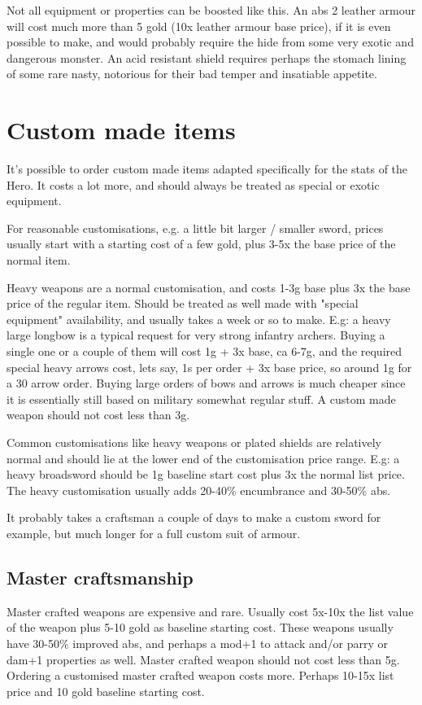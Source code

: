 Not all equipment or properties can be boosted like this. An abs 2 leather armour will cost much more than 5 gold (10x leather armour base price), if it is even possible to make, and would probably require the hide from some very exotic and dangerous monster. An acid resistant shield requires perhaps the stomach lining of some rare nasty, notorious for their bad temper and insatiable appetite.


\section*{Custom made items}
It's possible to order custom made items adapted specifically for the stats of the Hero. It costs a lot more, and should always be treated as special or exotic equipment.

For reasonable customisations, e.g. a little bit larger / smaller sword, prices usually start with a starting cost of a few gold, plus 3-5x the base price of the normal item.

Heavy weapons are a normal customisation, and costs 1-3g base plus 3x the base price of the regular item. Should be treated as well made with "special equipment" availability, and usually takes a week or so to make.
E.g: a heavy large longbow is a typical request for very strong infantry archers. Buying a single one or a couple of them will cost 1g + 3x base, ca 6-7g, and the required special heavy arrows cost, lets say, 1s per order + 3x base price, so around 1g for a 30 arrow order. Buying large orders of bows and arrows is much cheaper since it is essentially still based on military somewhat regular stuff.
A custom made weapon should not cost less than 3g.

Common customisations like heavy weapons or plated shields are relatively normal and should lie at the lower end of the customisation price range. E.g: a heavy broadsword should be 1g baseline start cost plus 3x the normal list price.
The heavy customisation usually adds 20-40\% encumbrance and 30-50\% abs.

It probably takes a craftsman a couple of days to make a custom sword for example, but much longer for a full custom suit of armour.


\subsection*{Master craftsmanship}
Master crafted weapons are expensive and rare. Usually cost 5x-10x the list value of the weapon plus 5-10 gold as baseline starting cost. These weapons usually have 30-50\% improved abs, and perhaps a mod+1 to attack and/or parry or dam+1 properties as well. Master crafted weapon should not cost less than 5g.
Ordering a customised master crafted weapon costs more. Perhaps 10-15x list price and 10 gold baseline starting cost.


